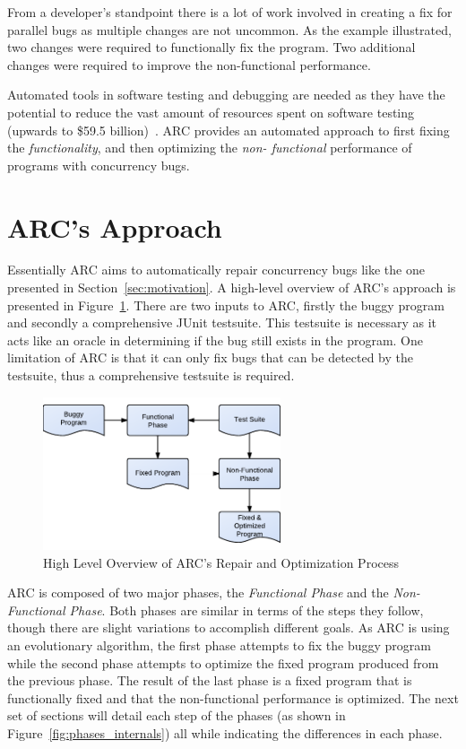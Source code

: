 \documentclass[10pt, conference, compsocconf]{IEEEtran}
\begin{document}
From a developer's standpoint there is a lot of work involved in creating a fix
for parallel bugs as multiple changes are not uncommon. As the example
illustrated, two changes were required to functionally fix the program. Two
additional changes were required to improve the non-functional performance.

Automated tools in software testing and debugging are needed as they have the
potential to reduce the vast amount of resources spent on software testing
(upwards to \$59.5 billion)~\cite{RTI02}. ARC provides an automated approach to
first fixing the \textit{functionality}, and then optimizing the \textit{non-
functional} performance of programs with concurrency bugs.

\section{ARC's Approach}
\label{sec:approach}

Essentially ARC aims to automatically repair concurrency bugs like the one
presented in Section~\ref{sec:motivation}. A high-level overview of ARC's
approach is presented in Figure~\ref{fig:process}. There are two inputs to ARC,
firstly the buggy program and secondly a comprehensive JUnit testsuite. This
testsuite is necessary as it acts like an oracle in determining if the bug
still exists in the program. One limitation of ARC is that it can only fix bugs
that can be detected by the testsuite, thus a comprehensive testsuite is
required.

\begin{figure}[!h]
  \centering
  \includegraphics[width=7.0cm]{figures/process.pdf}
  \caption{High Level Overview of ARC's Repair and Optimization Process}
  \label{fig:process}
\end{figure}

ARC is composed of two major phases, the \textit{Functional Phase} and the
\textit{Non-Functional Phase}. Both phases are similar in terms of the steps
they follow, though there are slight variations to accomplish different goals.
As ARC is using an evolutionary algorithm, the first phase attempts to fix the
buggy program while the second phase attempts to optimize the fixed program
produced from the previous phase. The result of the last phase is a fixed
program that is functionally fixed and that the non-functional performance is
optimized. The next set of sections will detail each step of the phases (as
shown in Figure~\ref{fig:phases_internals}) all while indicating the
differences in each phase.
\end{document}
